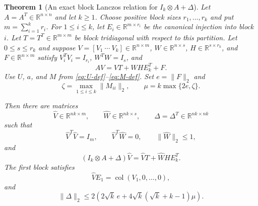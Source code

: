\documentclass[11pt]{article}
\newtheorem{theorem}{Theorem}
\theoremstyle{definition}
\newcommand{\col}{\operatorname{col}}
\newcommand{\R}{\mathbb{R}}
\begin{document}
\begin{theorem}[An exact block Lanczos relation for $I_k\otimes A+\Delta$]
\label{thm:block-global}
Let $A=A^T\in\R^{n\times n}$ and let $k\ge1$.  Choose positive block sizes
$r_1,\ldots,r_k$ and put $m=\sum_{i=1}^k r_i$.  For $1\le i\le k$, let
$E_i\in\R^{m\times r_i}$ be the canonical injection into block $i$.
Let $T=T^T\in\R^{m\times m}$ be block tridiagonal with respect to this
partition.  Let $0\le s\le r_k$ and suppose
$V=[V_1\ \cdots\ V_k]\in\R^{n\times m}$,
$W\in\R^{n\times s}$, $H\in\R^{s\times r_k}$, and
$F\in\R^{n\times m}$ satisfy $V_i^TV_i=I_{r_i}$, $W^TW=I_s$, and
\begin{equation}
 AV=VT+WHE_k^T+F.
 \label{eq:block-global-hypothesis}
\end{equation}
Use $U$, $a$, and $M$ from \eqref{eq:U-def}--\eqref{eq:M-def}.  Set
$e=\|F\|_2$ and
\[
 \zeta=\max_{1\le i\le k}\|M_{ii}\|_2,
 \qquad \mu=k\max\{2e,\zeta\}.
\]

Then there are matrices
\[
 \widehat V\in\R^{nk\times m},
 \qquad \widehat W\in\R^{nk\times s},
 \qquad \Delta=\Delta^T\in\R^{nk\times nk}
\]
such that
\begin{equation}
 \widehat V^T\widehat V=I_m,
 \qquad \widehat V^T\widehat W=0,
 \qquad \|\widehat W\|_2\le1,
 \label{eq:dilated-gram}
\end{equation}
and
\begin{equation}
 (I_k\otimes A+\Delta)\widehat V
 =\widehat VT+\widehat WHE_k^T.
 \label{eq:nearby-model}
\end{equation}
The first block satisfies
\begin{equation}
 \widehat V E_1=\col(V_1,0,\ldots,0),
 \label{eq:first-block-preserved}
\end{equation}
and
\begin{equation}
 \|\Delta\|_2
 \le2\left(2\sqrt{k}\,e+4\sqrt{k}(\sqrt{k}+k-1)\mu\right).
 \label{eq:Delta-bound}
\end{equation}
\end{theorem}
\end{document}
